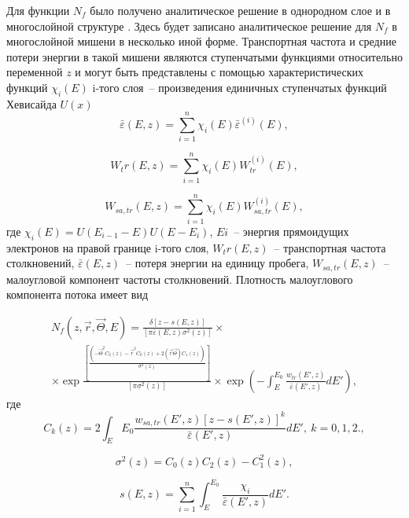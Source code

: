 Для функции $N_f$ было получено аналитическое решение в однородном слое \cite{smolar2} и в
многослойной структуре \cite{smolar}. Здесь будет записано аналитическое решение для $N_f$ в
многослойной мишени в несколько иной форме. Транспортная частота и средние потери
энергии в такой мишени являются ступенчатыми функциями относительно переменной $z$
и могут быть представлены с помощью характеристических функций $\chi_i(E)$ i-того слоя~-- 
произведения единичных ступенчатых функций Хевисайда $U(x)$
\begin{equation}
\bar{\varepsilon}(E,z)=\sum_{i=1}^n \chi_i (E)\bar{\varepsilon}^{(i)} (E),
\label{eq:2}
\end{equation}

\begin{equation}
W_tr(E,z)=\sum_{i=1}^n \chi_i (E)W_{tr}^{(i)} (E),
\label{eq:3}
\end{equation}

\begin{equation}
W_{sa,tr}(E,z)=\sum_{i=1}^n \chi_i (E)W_{sa,tr}^{(i)} (E),
\label{eq:4}
\end{equation}
где
$ \chi_i(E)=U(E_{i-1}-E)U(E-E_i) $,
$Ei$~-- энергия прямоидущих электронов на правой границе i-того слоя, $W_tr(E,z)$~-- 
транспортная частота столкновений, $\bar{\varepsilon}(E,z)$~-- потеря энергии на единицу пробега, $W_{sa,tr}(E,z)$~-- малоугловой компонент частоты столкновений.
Плотность малоуглового компонента потока имеет вид \cite{smolar}

\begin{gather}
N_f(z,\vec{r},\vec{\Theta},E)=\frac{\delta[z-s(E,z)]}{[\pi \bar{\varepsilon}(E,z)\sigma^2(z)]}\times\nonumber\\
\times \exp \frac{[\frac{(-\vec{\Theta}^2 C_2(z)-\vec{r}^2C_0 (z)+2(\vec{r}\vec{\Theta})C_1(z))}{\sigma^2(z)}]}{[\pi\sigma^2(z)]} \times \exp\left(-\int_{E}^{E_0} \frac{w_{tr}(E',z)}{\bar{\varepsilon}(E',z)}dE'\right),
\label{eq:6}
\end{gather}
где
\begin{equation}
C_k(z)=2 \int_{E}{E_0} \frac{w_{sa,tr}(E',z)[z-s(E',z)]^k}{\bar{\varepsilon}(E',z)} dE',\ k=0,1,2.,
\label{eq:7}
\end{equation}

\begin{equation}
\sigma^2(z)=C_0(z)C_2(z)-C_1^2(z),
\label{eq:8}
\end{equation}

\begin{equation}
s(E,z)=\sum_{i=1}^{n} \int_{E}^{E_0} \frac{\chi_i}{\bar{\varepsilon}(E',z)} dE'.
\label{eq:9}
\end{equation}

